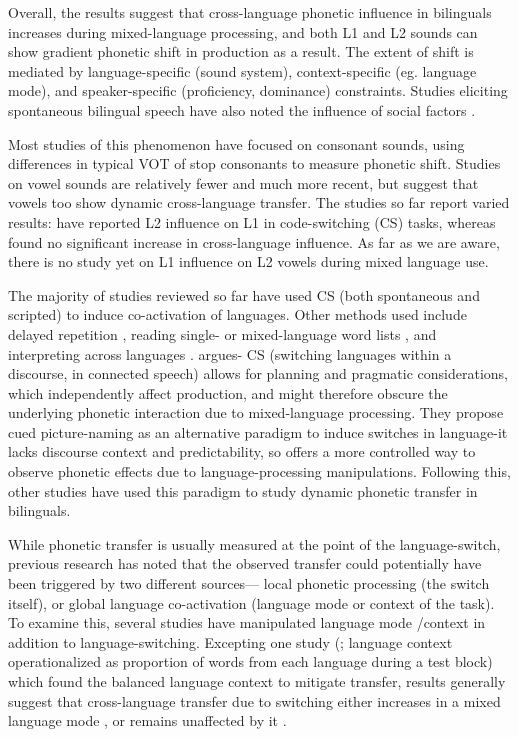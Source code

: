 \documentclass[11pt]{article}
\begin{document}
Overall, the results suggest that cross-language phonetic influence in bilinguals increases during mixed-language processing, and both L1 and L2 sounds can show gradient phonetic shift in production as a result. The extent of shift is mediated by language-specific (sound system), context-specific (eg. language mode), and speaker-specific (proficiency, dominance) constraints. Studies eliciting spontaneous bilingual speech have also noted the influence of social factors \cite{khattab2009phonetic}. 

Most studies of this phenomenon have focused on consonant sounds, using differences in typical VOT of stop consonants to measure phonetic shift. Studies on vowel sounds are relatively fewer and much more recent, but suggest that vowels too show dynamic cross-language transfer. The studies so far report varied results: \cite{elias2017effects,simonet2014phonetic,simonet2020increased} have reported L2 influence on L1 in code-switching (CS) tasks, whereas \cite{muldner2019phonetics} found no significant increase in cross-language influence. As far as we are aware, there is no study yet on L1 influence on L2 vowels during mixed language use.

The majority of studies reviewed so far have used CS (both spontaneous and scripted) to induce co-activation of languages. Other methods used include delayed repetition \cite{simonet2014phonetic}, reading single- or mixed-language word lists \cite{simonet2020increased}, and interpreting across languages \cite{vsimavckova2015immediate,vsimavckova2018patterns}. \cite{olson2013bilingual} argues- CS (switching languages within a discourse, in connected speech) allows for planning and pragmatic considerations, which independently affect production, and might therefore obscure the underlying phonetic interaction due to mixed-language processing. They propose cued picture-naming as an alternative paradigm to induce switches in language-it lacks discourse context and predictability, so offers a more controlled way to observe phonetic effects due to language-processing manipulations. Following this, other studies \cite{goldrick2014language,tsui2019impact} have used this paradigm to study dynamic phonetic transfer in bilinguals.

While phonetic transfer is usually measured at the point of the language-switch, previous research has noted that the observed transfer could potentially have been triggered by two different sources— local phonetic processing (the switch itself), or global language co-activation (language mode \cite{grosjean1998studying} or context of the task). To examine this, several studies have manipulated language mode /context in addition to language-switching. Excepting one study (\cite{olson2013bilingual}; language context operationalized as proportion of words from each language during a test block) which found the balanced language context to mitigate transfer, results generally suggest that cross-language transfer due to switching either increases in a mixed language mode \cite{simonet2014phonetic}, or remains unaffected by it \cite{schwartz2015language,vsimavckova2015immediate,olson2016role,simonet2020increased}.
\end{document}
